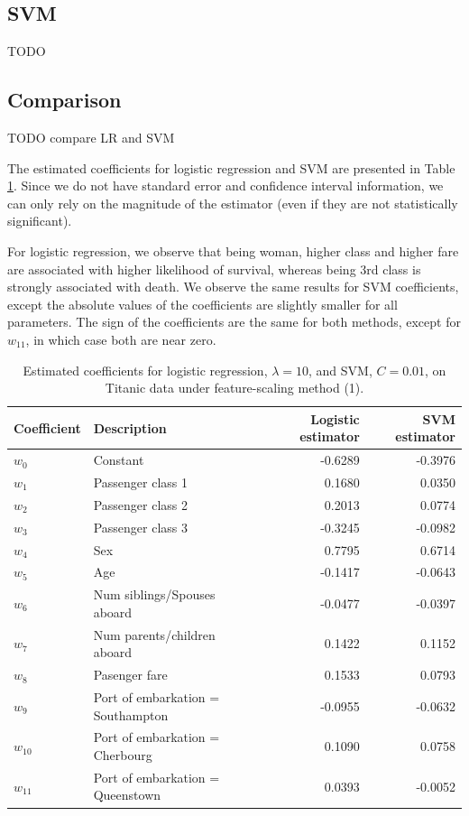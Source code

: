 \subsection{SVM}
TODO

\subsection{Comparison}
TODO compare LR and SVM

The estimated coefficients for logistic regression and SVM are presented in Table \ref{tab:titanic_coeff}. Since we do not have standard error and confidence interval information, we can only rely on the magnitude of the estimator (even if they are not statistically significant). 

For logistic regression, we observe that being woman, higher class and higher fare are associated with higher likelihood of survival, whereas being 3rd class is strongly associated with death. We observe the same results for SVM coefficients, except the absolute values of the coefficients are slightly smaller for all parameters.  The sign of the coefficients are the same for both methods, except for $w_{11}$, in which case both are near zero.  

\begin{table}[h!]
\centering
\caption{Estimated coefficients for logistic regression, $\lambda = 10$, and SVM, $C = 0.01$, on Titanic data under feature-scaling method (1).}
\begin{tabular}{llrr}
	\hline 
	Coefficient & Description & Logistic estimator & SVM estimator \\
  \hline
  $w_0$  & Constant &-0.6289 & -0.3976 \\
  $w_1$ 	& Passenger class 1 & 0.1680 & 0.0350\\
  $w_2$ 	& Passenger class 2	  & 0.2013 & 0.0774\\
  $w_3$  & Passenger class 3 & -0.3245 &  -0.0982\\
  $w_4$ 	 & Sex & 0.7795 & 0.6714\\
  $w_5$ 	 & Age & -0.1417 & -0.0643\\
  $w_6$ 	 & Num siblings/Spouses aboard & -0.0477 & -0.0397\\
  $w_7$ 	 & Num parents/children aboard & 0.1422 & 0.1152\\
  $w_8$ 	 & Pasenger fare & 0.1533 &  0.0793\\
  $w_9$ 	 & Port of embarkation = Southampton & -0.0955 & -0.0632\\
  $w_{10}$  & Port of embarkation = Cherbourg & 0.1090 &  0.0758\\
  $w_{11}$ & Port of embarkation = Queenstown	& 0.0393 & -0.0052\\
  \hline
\end{tabular}\label{tab:titanic_coeff}
\end{table}


